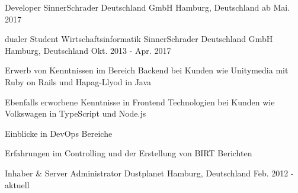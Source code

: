 

\begin{cventries}

  \cventry
    {Developer} %
    {SinnerSchrader Deutschland GmbH} %
    {Hamburg, Deutschland} %
    {ab Mai. 2017} %
    {
    }

  \cventry
    {dualer Student Wirtschaftsinformatik} %
    {SinnerSchrader Deutschland GmbH} %
    {Hamburg, Deutschland} %
    {Okt. 2013 - Apr. 2017} %
    {
      \begin{cvitems} %
        \item {Erwerb von Kenntnissen im Bereich Backend bei Kunden wie Unitymedia mit Ruby on Rails und Hapag-Llyod in Java}
        \item {Ebenfalls erworbene Kenntnisse in Frontend Technologien bei Kunden wie Volkswagen in TypeScript und Node.js}
        \item {Einblicke in DevOps Bereiche}
        \item {Erfahrungen im Controlling und der Erstellung von BIRT Berichten}
      \end{cvitems}
    }

  \cventry
    {Inhaber \& Server Administrator} %
    {Dustplanet} %
    {Hamburg, Deutschland} %
    {Feb. 2012 - aktuell} %
    {
    }

\end{cventries}
